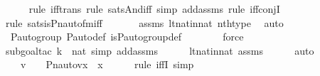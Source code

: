 \begin{isabellebody}
\ \ \ \ \isamarkupfalse%
{\isacharparenleft}{\kern0pt}rule\ iff{\isacharunderscore}{\kern0pt}trans{\isacharcomma}{\kern0pt}\ rule\ sats{\isacharunderscore}{\kern0pt}And{\isacharunderscore}{\kern0pt}iff{\isacharcomma}{\kern0pt}\ simp\ add{\isacharcolon}{\kern0pt}assms{\isacharcomma}{\kern0pt}\ rule\ iff{\isacharunderscore}{\kern0pt}conjI{}{\isacharparenright}{\kern0pt}\isanewline
\ \ \ \ \ \isamarkupfalse%
{\isacharparenleft}{\kern0pt}rule\ sats{\isacharunderscore}{\kern0pt}is{\isacharunderscore}{\kern0pt}Pn{\isacharunderscore}{\kern0pt}auto{\isacharunderscore}{\kern0pt}fm{\isacharunderscore}{\kern0pt}iff{\isacharparenright}{\kern0pt}\ \isanewline
\ \ \ \ \isamarkupfalse%
\ assms\ lt{\isacharunderscore}{\kern0pt}nat{\isacharunderscore}{\kern0pt}in{\isacharunderscore}{\kern0pt}nat\ nth{\isacharunderscore}{\kern0pt}type\ \isamarkupfalse%
\ auto{\isacharbrackleft}{\kern0pt}{}{\isacharbrackright}{\kern0pt}\isanewline
\ \ \ \ \isamarkupfalse%
\ {\isasymG}{\isacharunderscore}{\kern0pt}P{\isacharunderscore}{\kern0pt}auto{\isacharunderscore}{\kern0pt}group\ P{\isacharunderscore}{\kern0pt}auto{\isacharunderscore}{\kern0pt}def\ is{\isacharunderscore}{\kern0pt}P{\isacharunderscore}{\kern0pt}auto{\isacharunderscore}{\kern0pt}group{\isacharunderscore}{\kern0pt}def\ \isanewline
\ \ \ \ \ \isamarkupfalse%
\ force\isanewline
\ \ \ \ \isamarkupfalse%
{\isacharparenleft}{\kern0pt}subgoal{\isacharunderscore}{\kern0pt}tac\ {\isachardoublequoteopen}k\ {\isasymin}\ nat{\isachardoublequoteclose}{\isacharcomma}{\kern0pt}\ simp\ add{\isacharcolon}{\kern0pt}assms{\isacharparenright}{\kern0pt}\isanewline
\ \ \ \ \isamarkupfalse%
\ lt{\isacharunderscore}{\kern0pt}nat{\isacharunderscore}{\kern0pt}in{\isacharunderscore}{\kern0pt}nat\ assms\isanewline
\ \ \ \ \isamarkupfalse%
\ auto\ \isanewline
\ \ \isamarkupfalse%
\ \isamarkupfalse%
\ {\isachardoublequoteopen}{\isachardot}{\kern0pt}{\isachardot}{\kern0pt}{\isachardot}{\kern0pt}\ {\isasymlongleftrightarrow}\ {\isacharparenleft}{\kern0pt}v\ {\isasymin}\ {\isasymG}\ {\isasymand}\ Pn{\isacharunderscore}{\kern0pt}auto{\isacharparenleft}{\kern0pt}v{\isacharparenright}{\kern0pt}{\isacharbackquote}{\kern0pt}x\ {\isacharequal}{\kern0pt}\ x{\isacharparenright}{\kern0pt}{\isachardoublequoteclose}\ \isanewline
\ \ \ \ \isamarkupfalse%
{\isacharparenleft}{\kern0pt}rule\ iffI{\isacharcomma}{\kern0pt}\ simp{\isacharparenright}{\kern0pt}\isanewline

\end{isabellebody}
